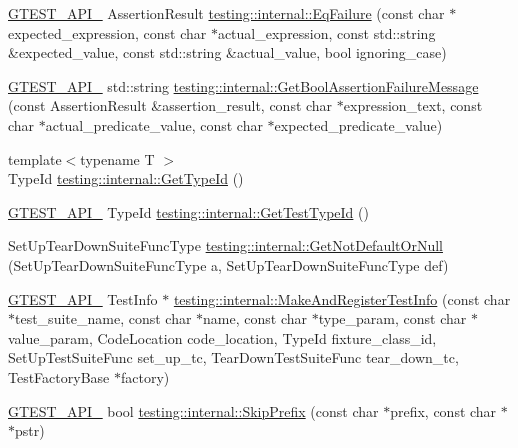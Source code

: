 \begin{DoxyCompactItemize}
\hyperlink{gtest-port_8h_aa73be6f0ba4a7456180a94904ce17790}{G\+T\+E\+S\+T\+\_\+\+A\+P\+I\+\_\+} Assertion\+Result \hyperlink{namespacetesting_1_1internal_ac61e2ba2cbf259fd6ee5ffd4e49c9445}{testing\+::internal\+::\+Eq\+Failure} (const char $\ast$expected\+\_\+expression, const char $\ast$actual\+\_\+expression, const std\+::string \&expected\+\_\+value, const std\+::string \&actual\+\_\+value, bool ignoring\+\_\+case)
\item 
\hyperlink{gtest-port_8h_aa73be6f0ba4a7456180a94904ce17790}{G\+T\+E\+S\+T\+\_\+\+A\+P\+I\+\_\+} std\+::string \hyperlink{namespacetesting_1_1internal_aed8d3ad4341f8f2de53440e39c995632}{testing\+::internal\+::\+Get\+Bool\+Assertion\+Failure\+Message} (const Assertion\+Result \&assertion\+\_\+result, const char $\ast$expression\+\_\+text, const char $\ast$actual\+\_\+predicate\+\_\+value, const char $\ast$expected\+\_\+predicate\+\_\+value)
\item 
{\footnotesize template$<$typename T $>$ }\\Type\+Id \hyperlink{namespacetesting_1_1internal_a6b108e56fdc68ea937ffb3759fb55ab0}{testing\+::internal\+::\+Get\+Type\+Id} ()
\item 
\hyperlink{gtest-port_8h_aa73be6f0ba4a7456180a94904ce17790}{G\+T\+E\+S\+T\+\_\+\+A\+P\+I\+\_\+} Type\+Id \hyperlink{namespacetesting_1_1internal_a1e85cf16bb95b60f879d48ba1fbfc1c9}{testing\+::internal\+::\+Get\+Test\+Type\+Id} ()
\item 
Set\+Up\+Tear\+Down\+Suite\+Func\+Type \hyperlink{namespacetesting_1_1internal_a9579a78c229ea302caded45d65f77336}{testing\+::internal\+::\+Get\+Not\+Default\+Or\+Null} (Set\+Up\+Tear\+Down\+Suite\+Func\+Type a, Set\+Up\+Tear\+Down\+Suite\+Func\+Type def)
\item 
\hyperlink{gtest-port_8h_aa73be6f0ba4a7456180a94904ce17790}{G\+T\+E\+S\+T\+\_\+\+A\+P\+I\+\_\+} Test\+Info $\ast$ \hyperlink{namespacetesting_1_1internal_a7ab4072540184e26119ad853f45059f7}{testing\+::internal\+::\+Make\+And\+Register\+Test\+Info} (const char $\ast$test\+\_\+suite\+\_\+name, const char $\ast$name, const char $\ast$type\+\_\+param, const char $\ast$value\+\_\+param, Code\+Location code\+\_\+location, Type\+Id fixture\+\_\+class\+\_\+id, Set\+Up\+Test\+Suite\+Func set\+\_\+up\+\_\+tc, Tear\+Down\+Test\+Suite\+Func tear\+\_\+down\+\_\+tc, Test\+Factory\+Base $\ast$factory)
\item 
\hyperlink{gtest-port_8h_aa73be6f0ba4a7456180a94904ce17790}{G\+T\+E\+S\+T\+\_\+\+A\+P\+I\+\_\+} bool \hyperlink{namespacetesting_1_1internal_aac72b20299ad4a99554ce161e1769560}{testing\+::internal\+::\+Skip\+Prefix} (const char $\ast$prefix, const char $\ast$$\ast$pstr)
$$
\end{DoxyCompactItemize}
